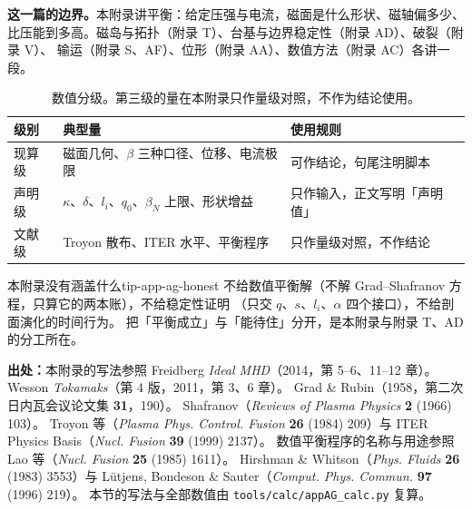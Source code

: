 \textbf{这一篇的边界。}本附录讲平衡：给定压强与电流，磁面是什么形状、磁轴偏多少、
比压能到多高。磁岛与拓扑（附录 T）、台基与边界稳定性（附录 AD）、破裂（附录 V）、
输运（附录 S、AF）、位形（附录 AA）、数值方法（附录 AC）各讲一段。

\begin{table}[htbp]
\centering
\small
\caption{数值分级。第三级的量在本附录只作量级对照，不作为结论使用。}
\label{tab:app-ag-source}
\begin{tabular}{p{3.2cm}p{4.0cm}p{4.4cm}}
\toprule
级别 & 典型量 & 使用规则 \\
\midrule
现算级 & 磁面几何、$\beta$ 三种口径、位移、电流极限 & 可作结论，句尾注明脚本 \\
声明级 & $\kappa$、$\delta$、$l_i$、$q_0$、$\beta_N$ 上限、形状增益 & 只作输入，正文写明「声明值」 \\
文献级 & Troyon 散布、ITER 水平、平衡程序 & 只作量级对照，不作结论 \\
\bottomrule
\end{tabular}

\end{table}

\begin{tip}{本附录没有涵盖什么}{tip-app-ag-honest}
不给数值平衡解（不解 Grad--Shafranov 方程，只算它的两本账），不给稳定性证明
（只交 $q$、$s$、$l_i$、$\alpha$ 四个接口），不给剖面演化的时间行为。
把「平衡成立」与「能待住」分开，是本附录与附录 T、AD 的分工所在。
\end{tip}

\textbf{出处：}本附录的写法参照 Freidberg \emph{Ideal MHD}（2014，第 5--6、11--12 章）。
Wesson \emph{Tokamaks}（第 4 版，2011，第 3、6 章）。
Grad \& Rubin（1958，第二次日内瓦会议论文集 \textbf{31}，190）。
Shafranov（\emph{Reviews of Plasma Physics} \textbf{2} (1966) 103）。
Troyon 等（\emph{Plasma Phys. Control. Fusion} \textbf{26} (1984) 209）与 ITER Physics Basis（\emph{Nucl. Fusion} \textbf{39} (1999) 2137）。
数值平衡程序的名称与用途参照 Lao 等（\emph{Nucl. Fusion} \textbf{25} (1985) 1611）。
Hirshman \& Whitson（\emph{Phys. Fluids} \textbf{26} (1983) 3553）与 Lütjens, Bondeson \& Sauter（\emph{Comput. Phys. Commun.} \textbf{97} (1996) 219）。
本节的写法与全部数值由 \texttt{tools/\allowbreak{}calc/\allowbreak{}appAG\_calc.py} 复算。
\endgroup